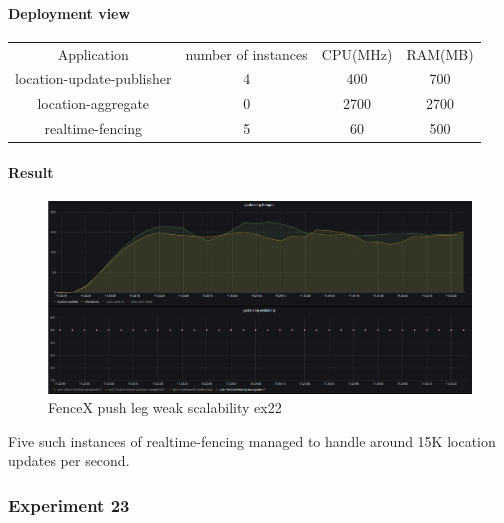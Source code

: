\documentclass[a4]{report}
\begin{document}
    \paragraph{Deployment view}
    \begin{center}
        \begin{tabular}{ c c c c }
            Application               & number of instances & CPU(MHz) & RAM(MB) \\
            location-update-publisher & 4                   & 400      & 700     \\
            location-aggregate        & 0                   & 2700     & 2700    \\
            realtime-fencing          & 5                   & 60       & 500     \\
        \end{tabular}
    \end{center}

    \paragraph{Result}
    \begin{figure}[ht]
        \caption{FenceX push leg weak scalability ex22}
        \label{fig:ex22}
        \includegraphics[scale=0.4]{images/evaluation/ex22-benchmarking-ongoing-1per2sec.png}
    \end{figure}
    Five such instances of realtime-fencing managed to handle around 15K location updates per second.

    \subsubsection{Experiment 23}
\end{document}
